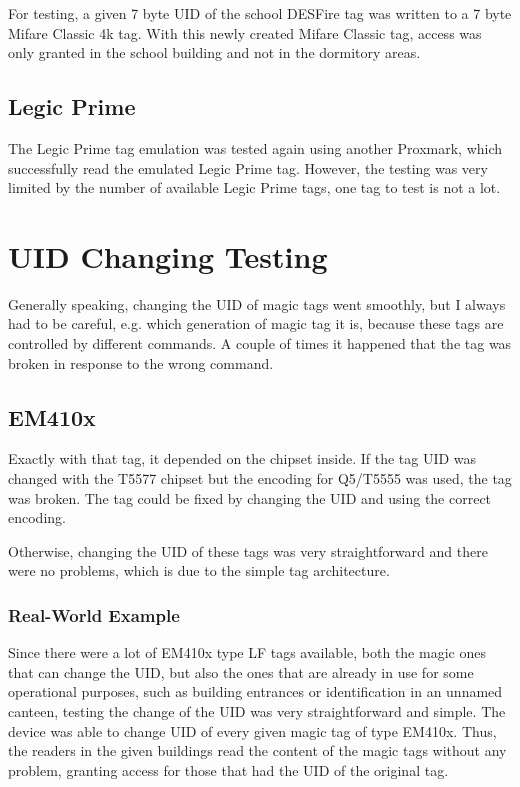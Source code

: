 For testing, a given 7 byte UID of the school DESFire tag was written to a 7 byte Mifare Classic 4k tag. With this newly created Mifare Classic tag, access was only granted in the school building and not in the dormitory areas.  

\subsection{Legic Prime}

The Legic Prime tag emulation was tested again using another Proxmark, which successfully read the emulated Legic Prime tag. However, the testing was very limited by the number of available Legic Prime tags, one tag to test is not a lot. 

\section{UID Changing Testing}
Generally speaking, changing the UID of magic tags went smoothly, but I always had to be careful, e.g. which generation of magic tag it is, because these tags are controlled by different commands. A couple of times it happened that the tag was broken in response to the wrong command.

\subsection{EM410x}
Exactly with that tag, it depended on the chipset inside. If the tag UID was changed with the T5577 chipset but the encoding for Q5/T5555 was used, the tag was broken. The tag could be fixed by changing the UID and using the correct encoding.

Otherwise, changing the UID of these tags was very straightforward and there were no problems, which is due to the simple tag architecture.

\subsubsection{Real-World Example}
Since there were a lot of EM410x type LF tags available, both the magic ones that can change the UID, but also the ones that are already in use for some operational purposes, such as building entrances or identification in an unnamed canteen, testing the change of the UID was very straightforward and simple. The device was able to change UID of every given magic tag of type EM410x. Thus, the readers in the given buildings read the content of the magic tags without any problem, granting access for those that had the UID of the original tag. 

